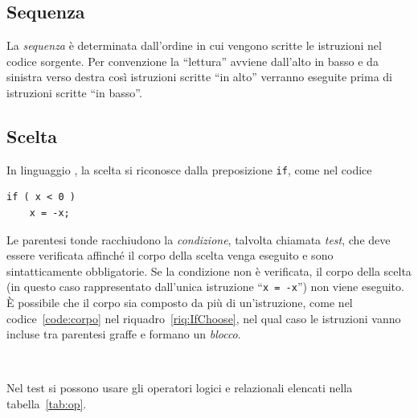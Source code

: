 		\subsection{Sequenza}

La \emph{sequenza} è determinata dall'ordine in cui vengono scritte le istruzioni nel codice sorgente.
Per convenzione la ``lettura'' avviene dall'alto in basso e da sinistra verso destra così istruzioni scritte ``in alto'' verranno eseguite prima di istruzioni scritte ``in basso''.

		\subsection{Scelta}
In linguaggio , la scelta si riconosce dalla preposizione \lstinline!if!, come nel codice

\begin{lstlisting}
if ( x < 0 )
	x = -x;
\end{lstlisting}
Le parentesi tonde racchiudono la \emph{condizione}, talvolta chiamata \emph{test}, che deve essere verificata affinché il corpo della scelta venga eseguito e sono sintatticamente obbligatorie.
Se la condizione non è verificata, il corpo della scelta (in questo caso rappresentato dall'unica istruzione ``\lstinline!x = -x!'') non viene eseguito.
\`E possibile che il corpo sia composto da più di un'istruzione, come nel codice~\ref{code:corpo} nel riquadro~\ref{riq:IfChoose}, nel qual caso le istruzioni vanno incluse tra parentesi graffe e formano un \emph{blocco}.

\begin{table}
\centering
	\caption{Alcuni operatori nel linguaggio .}
	\label{tab:op}
\\
\end{table}
Nel test si possono usare gli operatori logici e relazionali elencati nella tabella~\ref{tab:op}.

